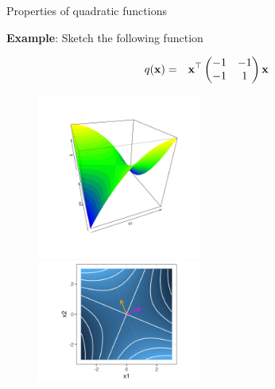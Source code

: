   \begin{vbframe}{Properties of quadratic functions}
  
  \textbf{Example}: Sketch the following function
  
  \begin{eqnarray*}
    q(\xv) &=& \xv^\top \begin{pmatrix} -1 & -1 \\ -1 & 1\end{pmatrix} \xv %
  \end{eqnarray*}
  
    \vspace*{-1cm}
  
  \begin{figure}
    \includegraphics[width = 0.48\textwidth]{figure_man/quadratic_functions_2D_example_2_1.png} ~~ \includegraphics[width = 0.48\textwidth, keepaspectratio]{figure_man/quadratic_functions_2D_example_2_4.png}
  \end{figure}
  
  \end{vbframe}
  
  
  
  
  
